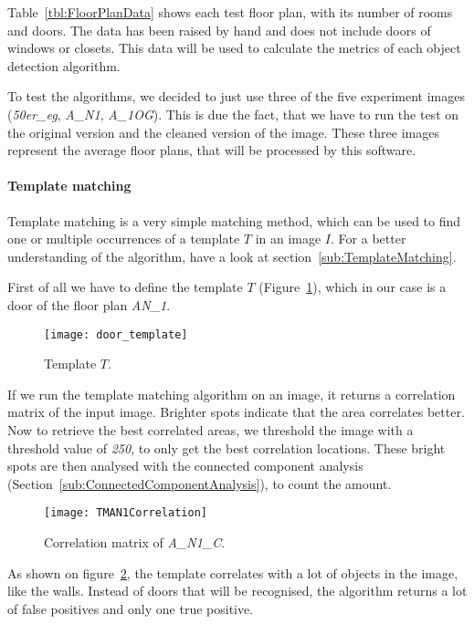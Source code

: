 Table~\ref{tbl:FloorPlanData} shows each test floor plan, with its number of rooms and doors. The data has been raised by hand and does not include doors of windows or closets. This data will be used to calculate the metrics of each object detection algorithm.

To test the algorithms, we decided to just use three of the five experiment images (\textit{50er\_eg}, \textit{A\_N1}, \textit{A\_1OG}). This is due the fact, that we have to run the test on the original version and the cleaned version of the image. These three images represent the average floor plans, that will be processed by this software.

\paragraph{Template matching}
\label{sub:ImpTemplateMatching}

Template matching is a very simple matching method, which can be used to find one or multiple occurrences of a template $T$ in an image $I$. For a better understanding of the algorithm, have a look at section~\ref{sub:TemplateMatching}.

First of all we have to define the template $T$ (Figure~\ref{fig:DoorTemplate}), which in our case is a door of the floor plan \textit{AN\_1}.

\begin{figure}[H]
	\centering
	\texttt{[image: door\_template]}
	\caption{Template $T$.}
	\label{fig:DoorTemplate}
\end{figure}

If we run the template matching algorithm on an image, it returns a correlation matrix of the input image. Brighter spots indicate that the area correlates better. Now to retrieve the best correlated areas, we threshold the image with a threshold value of \textit{250}, to only get the best correlation locations. These bright spots are then analysed with the connected component analysis (Section~\ref{sub:ConnectedComponentAnalysis}), to count the amount.

\begin{figure}[H]
	\centering
	\texttt{[image: TMAN1Correlation]}
	\caption{Correlation matrix of \textit{A\_N1\_C}.}
	\label{fig:TMAN1Correlation}
\end{figure}

As shown on figure~\ref{fig:TMAN1Correlation}, the template correlates with a lot of objects in the image, like the walls. Instead of doors that will be recognised, the algorithm returns a lot of false positives and only one true positive.

